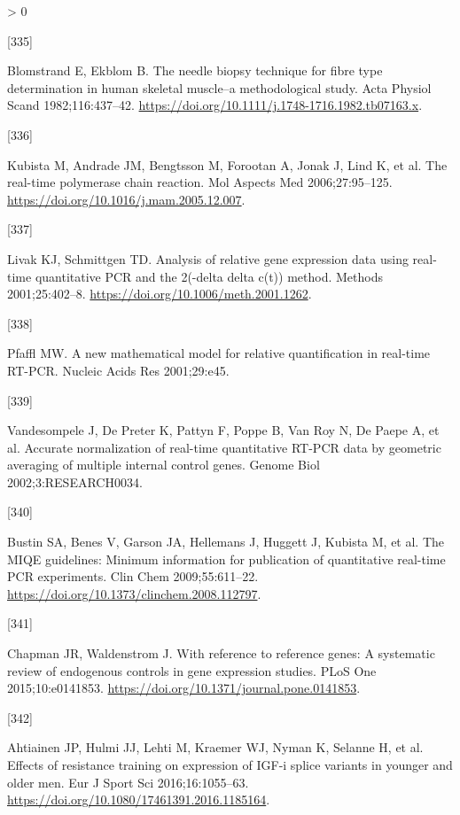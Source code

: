 \documentclass[twoside,10pt]{gihclass} %
\newlength{\cslhangindent}
\newlength{\csllabelwidth}
\newenvironment{CSLReferences}[3] %
 {%
  \setlength{\parindent}{0pt}
  \ifodd #1 \everypar{\setlength{\hangindent}{\cslhangindent}}\ignorespaces\fi
  \ifnum #2 > 0
  \setlength{\parskip}{#2\baselineskip}
  \fi
 }%
 {}
\newcommand{\CSLLeftMargin}[1]{\parbox[t]{\maxof{\widthof{#1}}{\csllabelwidth}}{#1}}
\newcommand{\CSLRightInline}[1]{\parbox[t]{\linewidth}{#1}}
\begin{document}
\begin{CSLReferences}{0}{0}
\leavevmode\hypertarget{ref-RN874}{}%
\CSLLeftMargin{{[}335{]} }
\CSLRightInline{Blomstrand E, Ekblom B. The needle biopsy technique for fibre type determination in human skeletal muscle--a methodological study. Acta Physiol Scand 1982;116:437--42. \url{https://doi.org/10.1111/j.1748-1716.1982.tb07163.x}.}

\leavevmode\hypertarget{ref-RN2099}{}%
\CSLLeftMargin{{[}336{]} }
\CSLRightInline{Kubista M, Andrade JM, Bengtsson M, Forootan A, Jonak J, Lind K, et al. The real-time polymerase chain reaction. Mol Aspects Med 2006;27:95--125. \url{https://doi.org/10.1016/j.mam.2005.12.007}.}

\leavevmode\hypertarget{ref-RN2100}{}%
\CSLLeftMargin{{[}337{]} }
\CSLRightInline{Livak KJ, Schmittgen TD. Analysis of relative gene expression data using real-time quantitative PCR and the 2(-delta delta c(t)) method. Methods 2001;25:402--8. \url{https://doi.org/10.1006/meth.2001.1262}.}

\leavevmode\hypertarget{ref-RN2101}{}%
\CSLLeftMargin{{[}338{]} }
\CSLRightInline{Pfaffl MW. A new mathematical model for relative quantification in real-time RT-PCR. Nucleic Acids Res 2001;29:e45.}

\leavevmode\hypertarget{ref-RN991}{}%
\CSLLeftMargin{{[}339{]} }
\CSLRightInline{Vandesompele J, De Preter K, Pattyn F, Poppe B, Van Roy N, De Paepe A, et al. Accurate normalization of real-time quantitative RT-PCR data by geometric averaging of multiple internal control genes. Genome Biol 2002;3:RESEARCH0034.}

\leavevmode\hypertarget{ref-RN1983}{}%
\CSLLeftMargin{{[}340{]} }
\CSLRightInline{Bustin SA, Benes V, Garson JA, Hellemans J, Huggett J, Kubista M, et al. The MIQE guidelines: Minimum information for publication of quantitative real-time PCR experiments. Clin Chem 2009;55:611--22. \url{https://doi.org/10.1373/clinchem.2008.112797}.}

\leavevmode\hypertarget{ref-RN1985}{}%
\CSLLeftMargin{{[}341{]} }
\CSLRightInline{Chapman JR, Waldenstrom J. With reference to reference genes: A systematic review of endogenous controls in gene expression studies. PLoS One 2015;10:e0141853. \url{https://doi.org/10.1371/journal.pone.0141853}.}

\leavevmode\hypertarget{ref-RN2083}{}%
\CSLLeftMargin{{[}342{]} }
\CSLRightInline{Ahtiainen JP, Hulmi JJ, Lehti M, Kraemer WJ, Nyman K, Selanne H, et al. Effects of resistance training on expression of IGF-i splice variants in younger and older men. Eur J Sport Sci 2016;16:1055--63. \url{https://doi.org/10.1080/17461391.2016.1185164}.}


\end{CSLReferences}
\end{document}
